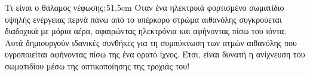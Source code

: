 \begin{MyColumnCenter}[detach title,before upper={\tcbtitle\quad}]{Τι είναι ο θάλαμος νέφωσης$\bf{;}$}{51.5cm}
  Όταν ένα ηλεκτρικά φορτισμένο σωματίδιο υψηλής ενέργειας περνά πάνω
  από το υπέρκορο στρώμα αιθανόλης συγκρούεται διαδοχικά με μόρια
  αέρα, αφαιρώντας ηλεκτρόνια και αφήνοντας πίσω του ιόντα.
  Αυτά δημιουργούν ιδανικές συνθήκες για τη συμπύκνωση των ατμών
  αιθανόλης που υγροποιείται αφήνοντας πίσω της ένα ορατό ίχνος.
  Έτσι, είναι δυνατή η ανίχνευση του σωματιδίου μέσω της
  οπτικοποίησης της τροχιάς του!\\

%

\end{MyColumnCenter}



